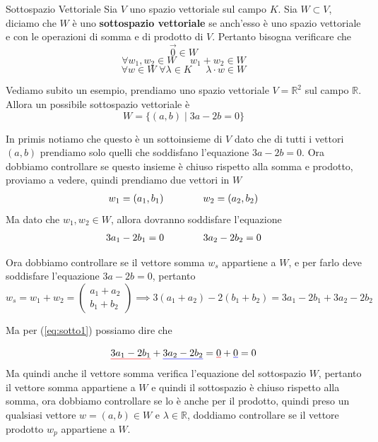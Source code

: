 \documentclass{rapport}
\def\mathunderline#1#2{\color{#1}\underline{{\color{black}#2}}\color{black}}
\begin{document}
\begin{definizione}{Sottospazio Vettoriale}{}
  Sia $V$ uno spazio vettoriale sul campo $K$. Sia $W \subset V$, diciamo che $W$ è uno \textbf{sottospazio vettoriale} se anch'esso è uno spazio vettoriale e con le operazioni di somma e di prodotto di $V$. Pertanto bisogna verificare che 
  \[
  \vec{0} \in W
  \]
  \[
  \forall w_1, w_2 \in W \;\;\;\;\; w_1 + w_2 \in W
  \]
  \[
  \forall w \in W \; \forall \lambda \in K \;\;\;\;\; \lambda \cdot w \in W
  \]
\end{definizione}

Vediamo subito un esempio, prendiamo uno spazio vettoriale $V = \mathbb{R}^2$ sul campo $\mathbb{R}$. Allora un possibile sottospazio vettoriale è 
\[
W=\{(a,b) \;| \;3a-2b=0\}
\]

In primis notiamo che questo è un sottoinsieme di $V$ dato che di tutti i vettori $(a,b)$ prendiamo solo quelli che soddisfano l'equazione $3a-2b=0$. Ora dobbiamo controllare se questo insieme è chiuso rispetto alla somma e prodotto, proviamo a vedere, quindi prendiamo due vettori in $W$
\[
\begin{array}{c@{\qquad}@{\qquad}c}
  w_1 = (a_1, b_1) & w_2 = (a_2, b_2) 
\end{array}
\]
Ma dato che $w_1,w_2 \in W$, allora dovranno soddisfare l'equazione
\begin{equation}\label{eq:sotto1}
  \begin{array}{c@{\qquad}@{\qquad}c}
  3a_1-2b_1=0 &   3a_2-2b_2=0 
\end{array}
\end{equation}



Ora dobbiamo controllare se il vettore somma $w_s$ appartiene a $W$, e per farlo deve soddisfare l'equazione $3a-2b=0$, pertanto 
\[
w_s=w_1+w_2 = \begin{pmatrix}
  a_1+a_2 \\
  b_1+b_2
\end{pmatrix} \implies 3(a_1+a_2) - 2(b_1+b_2) = 3a_1-2b_1 + 3a_2 - 2b_2
\] 

Ma per (\ref{eq:sotto1}) possiamo dire che 

\[
\mathunderline{red}{3a_1-2b_1} + \mathunderline{blue}{3a_2 - 2b_2} = \mathunderline{red}{0} + \mathunderline{blue}{0}  =0 
\]
Ma quindi anche il vettore somma verifica l'equazione del sottospazio $W$, pertanto il vettore somma appartiene a $W$ e quindi il sottospazio è chiuso rispetto alla somma, ora dobbiamo controllare se lo è anche per il prodotto, quindi preso un qualsiasi vettore $w = (a,b) \in W$ e $\lambda \in \mathbb{R}$, doddiamo controllare se il vettore prodotto $w_p$ appartiene a $W$. 
\end{document}
